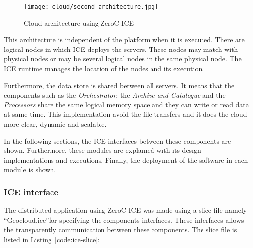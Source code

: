 \begin{figure}[!h]
\begin{center}
\texttt{[image: cloud/second-architecture.jpg]}
\caption{Cloud architecture using ZeroC ICE}
\label{fig:ice-architecture}
\end{center}
\end{figure}

This architecture is independent of the platform when it is executed. There are
logical nodes in which ICE deploys the servers. These nodes may match with
physical nodes or may be several logical nodes in the same physical node. The
ICE runtime manages the location of the nodes and its execution.

Furthermore, the data store is shared between all servers. It means that the
components such as the \emph{Orchestrator}, the \emph{Archive and Catalogue} and the
\emph{Processors} share the same logical memory space and they can write or read data
at same time. This implementation avoid the file transfers and it does the cloud
more clear, dynamic and scalable.

In the following sections, the  ICE interfaces between these components are
shown. Furthermore, these modules are explained with its design,
implementations and executions. Finally, the
deployment of the software in each module is shown.

\subsubsection{ICE interface}

The distributed application using ZeroC ICE was made using a slice file namely
``Geocloud.ice''for
specifying the components interfaces. These interfaces allows the transparently
communication between these components. The slice file is listed in Listing~\ref{code:ice-slice}:


